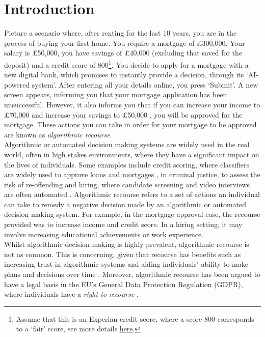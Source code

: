 \chapter{Introduction}

Picture a scenario where, after renting for the last 10 years, you are in the process of buying your first home. You require a mortgage of £300,000. Your salary is £50,000, you have savings of £40,000 (excluding that saved for the deposit) and a credit score of 800\footnote{Assume that this is an Experian credit score, where a score 800 corresponds to a `fair' score, see more details \href{https://www.experian.co.uk/consumer/experian-credit-score.html}{here}.}. You decide to apply for a mortgage with a new digital bank, which promises to instantly provide a decision, through its `AI-powered system'. After entering all your details online, you press `Submit'. A new screen appears, informing you that your mortgage application has been unsuccessful. However, it also informs you that if you can increase your income to £70,000 and increase your savings to £50,000 , you will be approved for the mortgage. These actions you can take in order for your mortgage to be approved are known as \textit{algorithmic recourse}.\\

Algorithmic or automated decision making systems are widely used in the real world, often in high stakes environments, where they have a significant impact on the lives of individuals. Some examples include credit scoring, where classifiers are widely used to approve loans and mortgages \citep{odwyerAreYouCreditworthy2018}, in criminal justice, to assess the risk of re-offending \citep{angwinMachineBias2016} and hiring, where candidate screening and video interviews are often automated \citep{kramerProblemsAIVideo2022}. Algorithmic recourse refers to a set of actions an individual can take to remedy a negative decision made by an algorithmic or automated decision making system. For example, in the mortgage approval case, the recourse provided was to increase income and credit score. In a hiring setting, it may involve increasing educational achievements or work experience.\\


Whilst algorithmic decision making is highly prevalent, algorithmic recourse is not as common. This is concerning, given that recourse has benefits such as increasing trust in algorithmic systems and aiding individuals' ability to make plans and decisions over time \citep{venkatasubramanianPhilosophicalBasisAlgorithmic2020}. Moreover, algorithmic recourse has been argued to have a legal basis in the EU's General Data Protection Regulation (GDPR), where individuals have a \textit{right to recourse} \citep{voigtEUGeneralData2017}.\\

